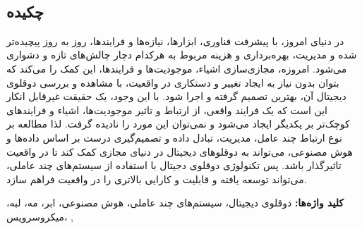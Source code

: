
\setcounter{page}{1}
\thispagestyle{empty}

~\vfill

\subsection*{چکیده}
\baselineskip=0.7cm



در دنیای امروز، با پیشرفت فناوری، ابزار‌ها، نیاز‌ه‌ها و فرایند‌ها، روز به روز پیچیده‌تر شده و مدیریت، بهره‌برداری و هزینه مربوط به هرکدام دچار چالش‌های تازه‌ و دشواری می‌شود.
امروزه، مجازی‌سازی اشیاء، موجودیت‌ها و فرایند‌ها، این کمک را می‌کند که بتوان بدون نیاز به ایجاد تغییر و دستکاری در واقعیت، با مشاهده و بررسی دوقلوی دیجیتال آن، بهترین تصمیم گرفته و اجرا شود. 
با این وجود، یک حقیقت غیرقابل انکار این است که یک فرایند واقعی، از ارتباط و تاثیر موجودیت‌ها، اشیاء و فرایند‌های کوچک‌تر بر یکدیگر ایجاد می‌شود و نمی‌توان این مورد را نادیده گرفت. لذا مطالعه بر نوع ارتباط چند عامل، مدیریت،‌ تبادل داده و تصمیم‌گیری درست بر اساس داده‌ها و هوش مصنوعی، می‌تواند به دوقلو‌های دیجیتال در دنیای مجازی کمک کند تا در واقعیت تاثیرگذار باشد.
پس تکنولوژی دوقلو‌ی دجیتال با استفاده از سیستم‌های چند عاملی، می‌تواند توسعه یافته و قابلیت و کارایی بالاتری را در واقعیت فراهم سازد. \\




\begin{small}


\noindent\textbf{کلید ‌واژه‌ها:}
دوقلو‌ی دیجیتال، سیستم‌های چند عاملی، هوش‌ مصنوعی، ابر، مه، لبه، میکروسرویس،
,
\\


\end{small}
